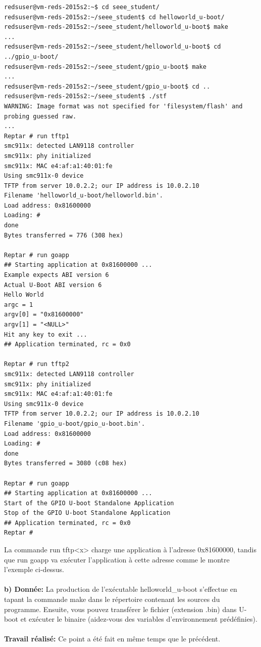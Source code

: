 \begin{lstlisting}
redsuser@vm-reds-2015s2:~$ cd seee_student/
redsuser@vm-reds-2015s2:~/seee_student$ cd helloworld_u-boot/
redsuser@vm-reds-2015s2:~/seee_student/helloworld_u-boot$ make
...
redsuser@vm-reds-2015s2:~/seee_student/helloworld_u-boot$ cd ../gpio_u-boot/
redsuser@vm-reds-2015s2:~/seee_student/gpio_u-boot$ make
...
redsuser@vm-reds-2015s2:~/seee_student/gpio_u-boot$ cd ..
redsuser@vm-reds-2015s2:~/seee_student$ ./stf 
WARNING: Image format was not specified for 'filesystem/flash' and probing guessed raw.
...
Reptar # run tftp1
smc911x: detected LAN9118 controller
smc911x: phy initialized
smc911x: MAC e4:af:a1:40:01:fe
Using smc911x-0 device
TFTP from server 10.0.2.2; our IP address is 10.0.2.10
Filename 'helloworld_u-boot/helloworld.bin'.
Load address: 0x81600000
Loading: #
done
Bytes transferred = 776 (308 hex)

Reptar # run goapp
## Starting application at 0x81600000 ...
Example expects ABI version 6
Actual U-Boot ABI version 6
Hello World
argc = 1
argv[0] = "0x81600000"
argv[1] = "<NULL>"
Hit any key to exit ... 
## Application terminated, rc = 0x0

Reptar # run tftp2
smc911x: detected LAN9118 controller
smc911x: phy initialized
smc911x: MAC e4:af:a1:40:01:fe
Using smc911x-0 device
TFTP from server 10.0.2.2; our IP address is 10.0.2.10
Filename 'gpio_u-boot/gpio_u-boot.bin'.
Load address: 0x81600000
Loading: #
done
Bytes transferred = 3080 (c08 hex)

Reptar # run goapp
## Starting application at 0x81600000 ...
Start of the GPIO U-boot Standalone Application
Stop of the GPIO U-boot Standalone Application
## Application terminated, rc = 0x0
Reptar #
\end{lstlisting}
La commande run tftp<x> charge une application à l'adresse 0x81600000, tandis que run goapp va exécuter l'application à cette adresse comme le montre l'exemple ci-dessus.\\\\
\textbf{b) Donnée: }La production de l'exécutable helloworld\_u-boot s'effectue en tapant la commande make dans le
répertoire contenant les sources du programme. Ensuite, vous pouvez transférer le fichier (extension
.bin) dans U-boot et exécuter le binaire (aidez-vous des variables d'environnement prédéfinies). \\\\
\textbf{Travail réalisé: } Ce point a été fait en même temps que le précédent.\\

